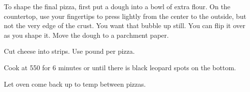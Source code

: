 \begin{recipe}
To shape the final pizza, first put a dough into a bowl of extra flour. On the countertop, use your fingertips to press lightly from the center to the outside, but not the very edge of the crust. You want that bubble up still. You can flip it over as you shape it. Move the dough to a parchment paper. 


Cut cheese into strips. Use  pound per pizza. 

Cook at 550\degree{} for 6 minutes or until there is black leopard spots on the bottom.  

Let oven come back up to temp between pizzas.

\end{recipe}
